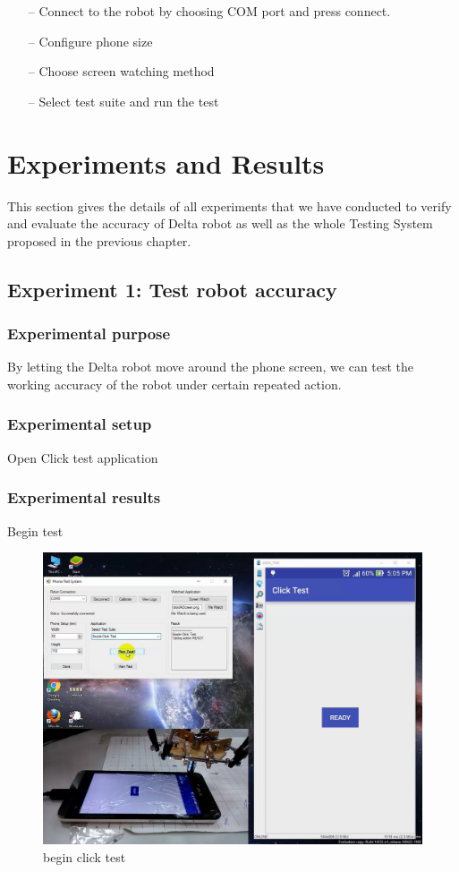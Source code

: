 	\begin{itemize}
		\item[--] Connect to the robot by choosing COM port and press connect.
		\item[--] Configure phone size
		\item[--] Choose screen watching method
		\item[--] Select test suite and run the test
	\end{itemize}

\section{Experiments and Results}
This section gives the details of all experiments that we have conducted to verify and evaluate the accuracy of Delta robot as well as the whole Testing System proposed in the previous chapter.

\subsection{Experiment 1: Test robot accuracy}
\subsubsection{Experimental purpose}
By letting the Delta robot move around the phone screen, we can test the working accuracy of the robot under certain repeated action.

\subsubsection{Experimental setup}
Open Click test application

\subsubsection{Experimental results}
Begin test
	\begin{figure}[H]
		\centering
		\includegraphics[scale=0.5]{Chapters/Fig/click_start.png}
		\caption{begin click test}
		\label{fig:click_start}
	\end{figure}

